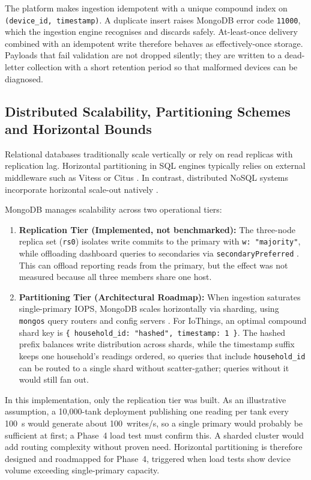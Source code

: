 \documentclass[11pt,a4paper]{article}
\begin{document}
The platform makes ingestion idempotent with a unique compound index on \texttt{(device\_id, timestamp)}. A duplicate insert raises MongoDB error code \texttt{11000}, which the ingestion engine recognises and discards safely. At-least-once delivery combined with an idempotent write therefore behaves as effectively-once storage. Payloads that fail validation are not dropped silently; they are written to a dead-letter collection with a short retention period so that malformed devices can be diagnosed.

\subsection{Distributed Scalability, Partitioning Schemes and Horizontal Bounds}\label{sec:partitioning}
Relational databases traditionally scale vertically or rely on read replicas with replication lag. Horizontal partitioning in SQL engines typically relies on external middleware such as Vitess \citep{vitess} or Citus \citep{citus}. In contrast, distributed NoSQL systems incorporate horizontal scale-out natively \citep{cattell2011}.

MongoDB manages scalability across two operational tiers:
\begin{enumerate}[noitemsep]
\item \textbf{Replication Tier (Implemented, not benchmarked):} The three-node replica set (\texttt{rs0}) isolates write commits to the primary with \texttt{w:~"majority"}, while offloading dashboard queries to secondaries via \texttt{secondaryPreferred} \citep{mongoRP}. This can offload reporting reads from the primary, but the effect was not measured because all three members share one host.
\item \textbf{Partitioning Tier (Architectural Roadmap):} When ingestion saturates single-primary IOPS, MongoDB scales horizontally via sharding, using \texttt{mongos} query routers and config servers \citep{mongoShard}. For IoThings, an optimal compound shard key is \texttt{\{ household\_id: "hashed", timestamp: 1 \}}. The hashed prefix balances write distribution across shards, while the timestamp suffix keeps one household's readings ordered, so queries that include \texttt{household\_id} can be routed to a single shard without scatter-gather; queries without it would still fan out.
\end{enumerate}

In this implementation, only the replication tier was built. As an illustrative assumption, a 10,000-tank deployment publishing one reading per tank every 100~s would generate about 100~writes/s, so a single primary would probably be sufficient at first; a Phase~4 load test must confirm this. A sharded cluster would add routing complexity without proven need. Horizontal partitioning is therefore designed and roadmapped for Phase~4, triggered when load tests show device volume exceeding single-primary capacity.
\end{document}
